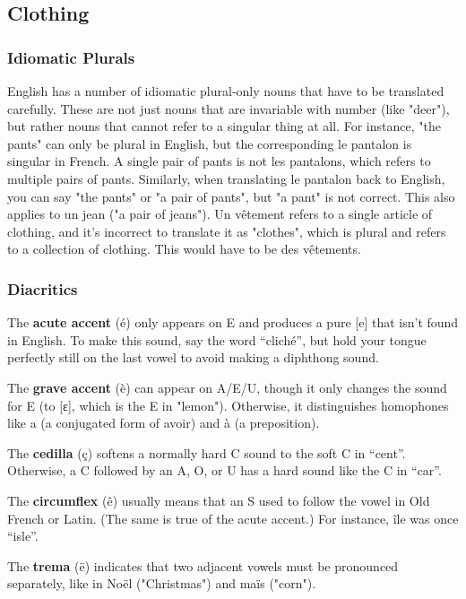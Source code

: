 \pagebreak
\subsection{Clothing}

\subsubsection{Idiomatic Plurals}

English has a number of idiomatic plural-only nouns that have to be translated carefully. These are not just nouns that are invariable with number (like "deer"), but rather nouns that cannot refer to a singular thing at all.  For instance, "the pants" can only be plural in English, but the corresponding le pantalon is singular in French. A single pair of pants is not les pantalons, which refers to multiple pairs of pants. Similarly, when translating le pantalon back to English, you can say "the pants" or "a pair of pants", but "a pant" is not correct. This also applies to un jean ("a pair of jeans").  Un v{\^e}tement refers to a single article of clothing, and it's incorrect to translate it as "clothes", which is plural and refers to a collection of clothing. This would have to be des v{\^e}tements.

\subsubsection{Diacritics}

The \textbf{acute accent} ({\'e}) only appears on E and produces a pure [e] that isn't found in English. To make this sound, say the word ``clich{\'e}'', but hold your tongue perfectly still on the last vowel to avoid making a diphthong sound.

The \textbf{grave accent} ({\`e}) can appear on A/E/U, though it only changes the sound for E (to [ɛ], which is the E in "lemon"). Otherwise, it distinguishes homophones like a (a conjugated form of avoir) and {\`a} (a preposition).

The \textbf{cedilla} ({\c c}) softens a normally hard C sound to the soft C in ``cent''. Otherwise, a C followed by an A, O, or U has a hard sound like the C in ``car''.

The \textbf{circumflex} ({\^e}) usually means that an S used to follow the vowel in Old French or Latin. (The same is true of the acute accent.) For instance, {\^i}le was once ``isle''.

The \textbf{trema} ({\"e}) indicates that two adjacent vowels must be pronounced separately, like in No{\"e}l ("Christmas") and ma{\"i}s ("corn").


